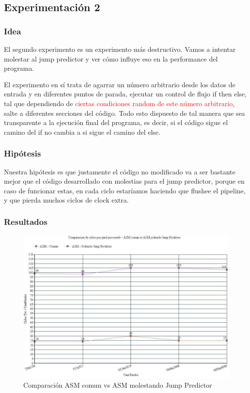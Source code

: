 \subsection{Experimentación 2}	

\subsubsection{Idea}
\par{El segundo experimento es un experimento más destructivo. Vamos a intentar molestar al jump predictor y ver cómo influye eso en la  performance del programa.}
\par{El experimento en sí trata de agarrar un número arbitrario desde los datos de entrada y en diferentes puntos de parada, ejecutar un control de flujo if then else, tal que dependiendo de \textcolor{red}{ciertas condiciones random de este número arbitrario}, salte a diferentes secciones del código. Todo esto dispuesto de tal manera que sea transparente a la ejecución final del programa, es decir, si el código sigue el camino del if no cambia a si sigue el camino del else.}

\subsubsection{Hipótesis}
\par{Nuestra hipótesis es que justamente el código no modificado va a ser bastante mejor que el código desarrollado con molestias para el jump predictor, porque en caso de funcionar estas, en cada ciclo estaríamos haciendo que flushee el pipeline, y que pierda muchos ciclos de clock extra.}
	
\subsubsection{Resultados}

\medskip\begin{figure}[h!]
\centering
\captionsetup{justification=centering}
	\includegraphics[width = 15 cm, height = 8 cm]{imagenes/JumpPredictor.jpg}
	\caption[center]{Comparación ASM comun vs ASM molestando Jump Predictor}
\end{figure}

